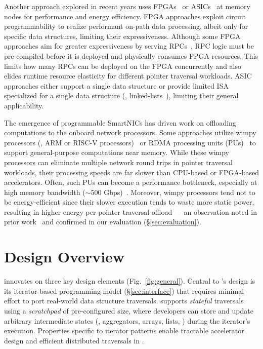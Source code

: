  Another approach explored in recent years uses FPGAs~\cite{clio,strom} or ASICs~\cite{impica, walkers} at memory nodes for performance and energy efficiency. FPGA approaches exploit circuit programmability to realize performant on-path data processing, albeit only for specific data structures, limiting their expressiveness. Although some FPGA approaches aim for greater expressiveness by serving RPCs~\cite{coyote}, RPC logic must be pre-compiled before it is deployed and physically consumes FPGA resources. This limits how many RPCs can be deployed on the FPGA concurrently and also elides runtime resource elasticity for different pointer traversal workloads. ASIC approaches either support a single data structure or provide limited ISA specialized for a single data structure (\eg, linked-lists~\cite{walkers}), limiting their general applicability. 

 The emergence of programmable SmartNICs has driven work on offloading computations to the onboard network processors. Some approaches utilize wimpy processors (\eg, ARM or RISC-V processors)~\cite{rmc_hotnets20} or RDMA processing units (PUs)~\cite{redn} to support general-purpose computations near memory. While these wimpy processors can eliminate multiple network round trips in pointer traversal workloads, their processing speeds are far slower than CPU-based or FPGA-based accelerators. Often, such PUs can become a performance bottleneck, especially at high memory bandwidth ($\sim$500 Gbps)~\cite{redn, disagg}. Moreover, wimpy processors tend not to be energy-efficient since their slower execution tends to waste more static power, resulting in higher energy per pointer traversal offload --- an observation noted in prior work~\cite{clio} and confirmed in our evaluation (\S\ref{sec:evaluation}). 


\section{\pulse Design Overview}
\label{sec:pulseoverview}


\pulse innovates on three key design elements (Fig.~\ref{fig:general}). Central to \pulse's design is its iterator-based programming model (\S\ref{sec:interface}) that requires minimal effort to port real-world data structure traversals. \pulse supports \emph{stateful} traversals using a \emph{scratchpad} of pre-configured size, where developers can store and update arbitrary intermediate states (\eg, aggregators, arrays, lists, \etc) during the iterator's execution. Properties specific to iterator patterns enable tractable accelerator design and efficient distributed traversals in \pulse. 

